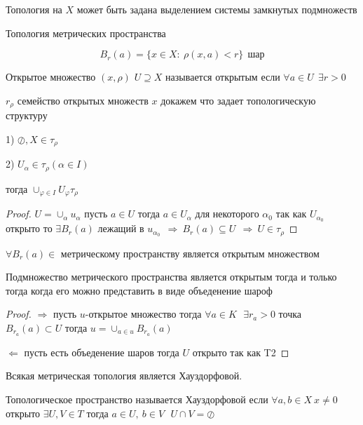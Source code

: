 \begin{block}[Замечание]
  Топология на $X$ может быть задана выделением системы замкнутых подмножеств
\end{block}

\begin{title}[\Large]
  Топология метрических пространства
\end{title}

$$
B_r(a) = \{x \in X : ~ \rho(x,a) < r\} ~~ \text{шар}
$$

Открытое множество $(x,\rho)$ $U \supseteq X$ называется открытым если
$\forall a \in U ~~ \exists r > 0$

$r_{\rho}$ семейство открытых множеств $x$ докажем что задает топологическую
структуру

1) $\oslash, X \in \tau_{\rho}$

2) $U_{\alpha} \in \tau_{\rho} (\alpha \in I)$

тогда $\cup_{\varphi \in I} U_{\varphi} \tau_{\rho}$

\begin{proof}
  $U = \cup_{\alpha} u_{\alpha}$ пусть $a \in U$ тогда $a \in U_{\alpha}$ для
  некоторого $\alpha_0$ так как $U_{\alpha_0}$ открыто то $\exists B_r(a)$
  лежащий в $u_{\alpha_0} ~~ \Rightarrow ~ B_r (a) \subseteq U ~~ \Rightarrow ~
  U \in \tau_{\rho}$
\end{proof}

\begin{theorem}
  $\forall B_r(a) \in$ метрическому пространству является открытым множеством
\end{theorem}

\begin{theorem}
  Подмножество метрического пространства является открытым тогда и только
  тогда когда его можно представить в виде объеденение шароф
\end{theorem}

\begin{proof}
  $\Rightarrow$ пусть $u$-открытое множество тогда $\forall a \in K ~~~
  \exists r_a > 0$ точка $B_{r_a}(a) \subset U$ тогда $u = \cup_{a \in u}
  B_{r_a}(a)$

  $\Leftarrow$ пусть есть объеденение шаров тогда $U$ открыто так как T2
\end{proof}

\begin{theorem}
  Всякая метрическая топология является Хауздорфовой.

  Топологическое пространство называется Хауздорфовой если $\forall a,b \in X ~
  x \not= 0$ открыто $\exists U, V \in T$ тогда $a \in U, ~ b \in V ~~~
  U \cap V = \oslash$
\end{theorem}


